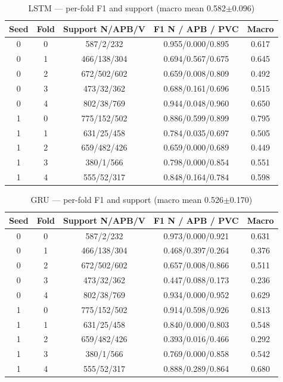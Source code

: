 \documentclass[10pt, conference, letterpaper]{IEEEtran}
\begin{document}
\begin{table}[h]
\centering
\caption{LSTM --- per-fold F1 and support (macro mean 0.582$\pm$0.096)}
\label{tab:supp-lstm}
\footnotesize
\begin{tabular}{cc c c c}
\toprule
Seed & Fold & Support N/APB/V & F1 N / APB / PVC & Macro\\
\midrule
0&0&587/2/232&0.955/0.000/0.895&0.617\\
0&1&466/138/304&0.694/0.567/0.675&0.645\\
0&2&672/502/602&0.659/0.008/0.809&0.492\\
0&3&473/32/362&0.688/0.161/0.696&0.515\\
0&4&802/38/769&0.944/0.048/0.960&0.650\\
1&0&775/152/502&0.886/0.599/0.899&0.795\\
1&1&631/25/458&0.784/0.035/0.697&0.505\\
1&2&659/482/426&0.659/0.000/0.689&0.449\\
1&3&380/1/566&0.798/0.000/0.854&0.551\\
1&4&555/52/317&0.848/0.164/0.784&0.598\\
\bottomrule
\end{tabular}
\end{table}

\begin{table}[h]
\centering
\caption{GRU --- per-fold F1 and support (macro mean 0.526$\pm$0.170)}
\label{tab:supp-gru}
\footnotesize
\begin{tabular}{cc c c c}
\toprule
Seed & Fold & Support N/APB/V & F1 N / APB / PVC & Macro\\
\midrule
0&0&587/2/232&0.973/0.000/0.921&0.631\\
0&1&466/138/304&0.468/0.397/0.264&0.376\\
0&2&672/502/602&0.657/0.008/0.866&0.511\\
0&3&473/32/362&0.447/0.088/0.173&0.236\\
0&4&802/38/769&0.934/0.000/0.952&0.629\\
1&0&775/152/502&0.914/0.598/0.926&0.813\\
1&1&631/25/458&0.840/0.000/0.803&0.548\\
1&2&659/482/426&0.393/0.016/0.466&0.292\\
1&3&380/1/566&0.769/0.000/0.858&0.542\\
1&4&555/52/317&0.888/0.289/0.864&0.680\\
\bottomrule
\end{tabular}
\end{table}
\end{document}
